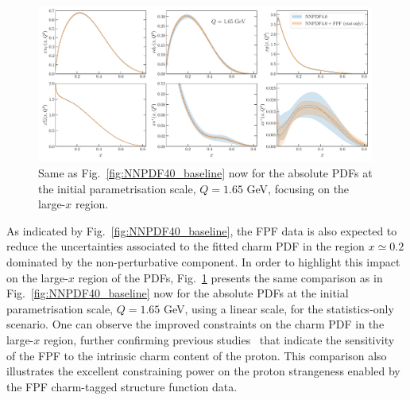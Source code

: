 \begin{figure}[t]
\centering
\includegraphics[width=0.99\textwidth]{plots/NNPDF40-FPFall-q1p65gev-abs.pdf}
\caption{
  Same as Fig.~\ref{fig:NNPDF40_baseline} now for the absolute PDFs
  at the initial parametrisation scale, $Q=1.65$ GeV, focusing
  on the large-$x$ region.
%
}
\label{fig:NNPDF40_lowQ_abs}
\end{figure}

As indicated by Fig.~\ref{fig:NNPDF40_baseline}, the FPF data is also expected
to reduce the uncertainties associated to the fitted charm PDF in the region $x\simeq 0.2$
dominated by the non-perturbative component.
%
In order to highlight this impact on the large-$x$ region of the PDFs,
Fig.~\ref{fig:NNPDF40_lowQ_abs} presents the same comparison as
in  Fig.~\ref{fig:NNPDF40_baseline} now for the absolute PDFs
at the initial parametrisation scale, $Q=1.65$ GeV, using a linear scale, for the statistics-only
scenario.
%
One can observe the improved constraints on the charm PDF in the large-$x$ region,
further confirming previous studies~\cite{Anchordoqui:2021ghd,Feng:2022inv} that indicate the
sensitivity of the FPF to the intrinsic charm content of the proton.
%
This comparison also illustrates the excellent constraining power on the proton
strangeness enabled by the FPF charm-tagged structure function data.

